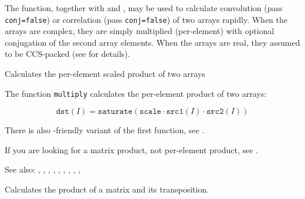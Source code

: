 The function, together with  and , may be used to calculate convolution (pass \texttt{conj=false}) or correlation (pass \texttt{conj=false}) of two arrays rapidly. When the arrays are complex, they are simply multiplied (per-element) with optional conjugation of the second array elements. When the arrays are real, they assumed to be CCS-packed (see  for details).

Calculates the per-element scaled product of two arrays

\begin{description}
\end{description}

The function \texttt{multiply} calculates the per-element product of two arrays:

\[
\texttt{dst}(I)=\texttt{saturate}(\texttt{scale} \cdot \texttt{src1}(I) \cdot \texttt{src2}(I))
\]

There is also -friendly variant of the first function, see .

If you are looking for a matrix product, not per-element product, see .

See also: , , , , , , , , , 

Calculates the product of a matrix and its transposition.

